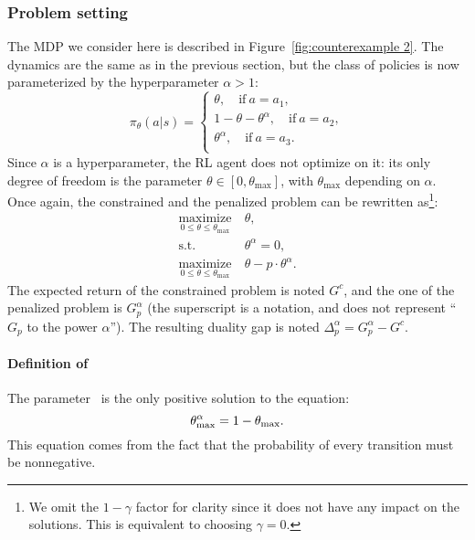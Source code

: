 \subsubsection{Problem setting}
The MDP we consider here is described in Figure~\ref{fig:counterexample 2}. The dynamics are the same as in the previous section, but the class of policies is now parameterized by the hyperparameter $\alpha > 1$:
$$
\pi_\theta(a|s) = \begin{cases}
\theta,\quad\text{if}~a=a_1,\\
1 - \theta - \theta^\alpha,\quad\text{if}~a=a_2,\\
\theta^\alpha,\quad\text{if}~a=a_3.\\
\end{cases}
$$
Since $\alpha$ is a hyperparameter, the RL agent does not optimize on it: its only degree of freedom is the parameter $\theta\in[0,\theta_\text{max}]$, with $\theta_\text{max}$ depending on $\alpha$. Once again, the constrained and the penalized problem can be rewritten as\footnote{We omit the $1-\gamma$ factor for clarity since it does not have any impact on the solutions. This is equivalent to choosing $\gamma = 0$.}:
\begin{align*}
\underset{0\leq\theta\leq\theta_\text{max}}{\text{maximize}}&~\theta,\\
\text{s.t.} &~\theta^\alpha = 0,\\
\underset{0\leq\theta\leq\theta_\text{max}}{\text{maximize}}&~\theta - p\cdot\theta^\alpha.
\end{align*}
The expected return of the constrained problem is noted $G^c$, and the one of the penalized problem is $G_p^\alpha$ (the superscript is a notation, and does not represent \enquote{$G_p$ to the power $\alpha$}). The resulting duality gap is noted $\Delta_p^\alpha = G_p^\alpha - G^c$.

\paragraph{Definition of \thetamax} The parameter \thetamax~is the only positive solution to the equation:
\begin{equation}
	\theta_\text{max}^\alpha = 1 - \theta_\text{max}.\label{eq:theta max}
\end{equation}
This equation comes from the fact that the probability of every transition must be nonnegative.

